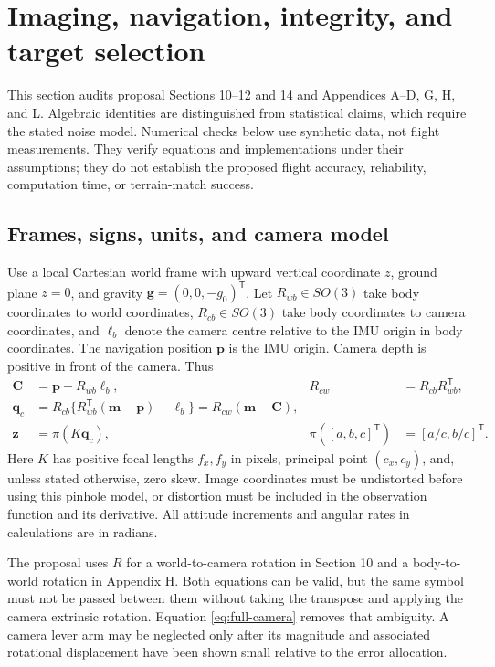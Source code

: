 \section{Imaging, navigation, integrity, and target selection}
\label{sec:navigation-maths}

This section audits proposal Sections 10--12 and 14 and Appendices
A--D, G, H, and L. Algebraic identities are distinguished from statistical
claims, which require the stated noise model. Numerical checks below use
synthetic data, not flight measurements. They verify equations and
implementations under their assumptions; they do not establish the proposed
flight accuracy, reliability, computation time, or terrain-match success.

\subsection{Frames, signs, units, and camera model}

Use a local Cartesian world frame with upward vertical coordinate $z$,
ground plane $z=0$, and gravity $\boldsymbol g=(0,0,-g_0)^{\mathsf T}$.
Let $R_{wb}\in SO(3)$ take body coordinates to world coordinates,
$R_{cb}\in SO(3)$ take body coordinates to camera coordinates, and
$\boldsymbol\ell_b$ denote the camera centre relative to the IMU origin in
body coordinates. The navigation position $\boldsymbol p$ is the IMU
origin. Camera depth is positive in front of the camera. Thus
\begin{align}
 \boldsymbol C&=\boldsymbol p+R_{wb}\boldsymbol\ell_b,
 &R_{cw}&=R_{cb}R_{wb}^{\mathsf T},\\
 \boldsymbol q_c&=R_{cb}\{R_{wb}^{\mathsf T}(\boldsymbol m-\boldsymbol p)
                         -\boldsymbol\ell_b\}
                 =R_{cw}(\boldsymbol m-\boldsymbol C),\\
 \boldsymbol z&=\pi(K\boldsymbol q_c),
 &\pi([a,b,c]^{\mathsf T})&=[a/c,b/c]^{\mathsf T}.
 \label{eq:full-camera}
\end{align}
Here $K$ has positive focal lengths $f_x,f_y$ in pixels, principal point
$(c_x,c_y)$, and, unless stated otherwise, zero skew. Image coordinates
must be undistorted before using this pinhole model, or distortion must be
included in the observation function and its derivative. All attitude
increments and angular rates in calculations are in radians.

The proposal uses $R$ for a world-to-camera rotation in Section 10 and
a body-to-world rotation in Appendix H. Both equations can be valid, but
the same symbol must not be passed between them without taking the
transpose and applying the camera extrinsic rotation. Equation
\eqref{eq:full-camera} removes that ambiguity. A camera lever arm may be
neglected only after its magnitude and associated rotational displacement
have been shown small relative to the error allocation.

